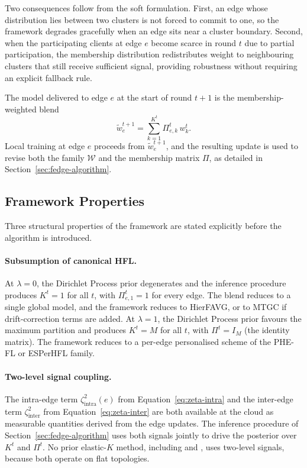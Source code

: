 Two consequences follow from the soft formulation. First, an edge whose distribution lies between two clusters is not forced to commit to one, so the framework degrades gracefully when an edge sits near a cluster boundary. Second, when the participating clients at edge $e$ become scarce in round $t$ due to partial participation, the membership distribution redistributes weight to neighbouring clusters that still receive sufficient signal, providing robustness without requiring an explicit fallback rule.

The model delivered to edge $e$ at the start of round $t+1$ is the membership-weighted blend
\begin{equation}
\label{eq:edge-blend}
\tilde{w}_{e}^{t+1} = \sum_{k=1}^{K^{t}} \Pi_{e,k}^{t} \, w_{k}^{t}.
\end{equation}
Local training at edge $e$ proceeds from $\tilde{w}_{e}^{t+1}$, and the resulting update is used to revise both the family $\mathcal{W}$ and the membership matrix $\Pi$, as detailed in Section~\ref{sec:fedge-algorithm}.

\subsection{Framework Properties}
\label{subsec:fedge-properties}

Three structural properties of the framework are stated explicitly before the algorithm is introduced.

\paragraph{Subsumption of canonical HFL.}
At $\lambda = 0$, the Dirichlet Process prior degenerates and the inference procedure produces $K^t = 1$ for all $t$, with $\Pi_{e,1}^{t} = 1$ for every edge. The blend reduces to a single global model, and the framework reduces to HierFAVG, or to MTGC if drift-correction terms are added. At $\lambda = 1$, the Dirichlet Process prior favours the maximum partition and produces $K^t = M$ for all $t$, with $\Pi^t = I_M$ (the identity matrix). The framework reduces to a per-edge personalised scheme of the PHE-FL or ESPerHFL family.

\paragraph{Two-level signal coupling.}
The intra-edge term $\zeta_{\text{intra}}^{2}(e)$ from Equation~\eqref{eq:zeta-intra} and the inter-edge term $\zeta_{\text{inter}}^{2}$ from Equation~\eqref{eq:zeta-inter} are both available at the cloud as measurable quantities derived from the edge updates. The inference procedure of Section~\ref{sec:fedge-algorithm} uses both signals jointly to drive the posterior over $K^t$ and $\Pi^t$. No prior elastic-$K$ method, including \cite{jaramillo2026dpmmcfl} and \cite{peng2025feddaa}, uses two-level signals, because both operate on flat topologies.

